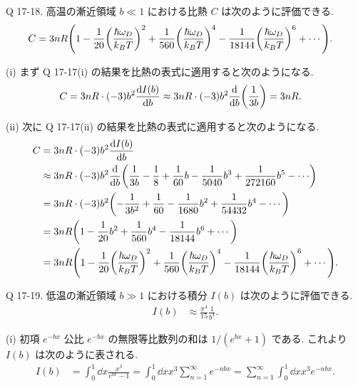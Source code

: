 \documentclass[uplatex,dvipdfmx,a4paper,11pt]{jlreq}
\theoremstyle{definition}
\begin{document}
\begin{itembox}[l]{Q 17-18.}
  高温の漸近領域 $b\ll 1$ における比熱 $C$ は次のように評価できる.
  \begin{align}
    C & = 3nR\qty(1 - \frac{1}{20}\qty(\frac{\hbar\omega_D}{k_BT})^2 + \frac{1}{560}\qty(\frac{\hbar\omega_D}{k_BT})^4 - \frac{1}{18144}\qty(\frac{\hbar\omega_D}{k_BT})^6 + \cdots).
  \end{align}
\end{itembox}

(i) まず Q 17-17(i) の結果を比熱の表式に適用すると次のようになる.
\begin{align}
  C & = 3nR\cdot (-3)b^2\dv{I(b)}{b} \approx 3nR\cdot (-3)b^2\dv{b}(\frac{1}{3b}) = 3nR.
\end{align}

(ii) 次に Q 17-17(ii) の結果を比熱の表式に適用すると次のようになる.
\begin{align}
  C & = 3nR\cdot (-3)b^2\dv{I(b)}{b}                                                                                                                                                \\
    & \approx 3nR\cdot (-3)b^2\dv{b}(\frac{1}{3b} - \frac{1}{8} + \frac{1}{60}b - \frac{1}{5040}b^3 + \frac{1}{272160}b^5 - \cdots)                                                 \\
    & = 3nR\cdot (-3)b^2\qty(-\frac{1}{3b^2} + \frac{1}{60} - \frac{1}{1680}b^2 + \frac{1}{54432}b^4 - \cdots)                                                                      \\
    & = 3nR\qty(1 - \frac{1}{20}b^2 + \frac{1}{560}b^4 - \frac{1}{18144}b^6 + \cdots)                                                                                               \\
    & = 3nR\qty(1 - \frac{1}{20}\qty(\frac{\hbar\omega_D}{k_BT})^2 + \frac{1}{560}\qty(\frac{\hbar\omega_D}{k_BT})^4 - \frac{1}{18144}\qty(\frac{\hbar\omega_D}{k_BT})^6 + \cdots).
\end{align}

\begin{itembox}[l]{Q 17-19.}
  低温の漸近領域 $b\gg 1$ における積分 $I(b)$ は次のように評価できる.
  \begin{align}
    I(b) & \approx \frac{\pi^4}{15}\frac{1}{b^4}.
  \end{align}
\end{itembox}

(i)
初項 $e^{-bx}$ 公比 $e^{-bx}$ の無限等比数列の和は $1/(e^{bx} + 1)$ である. これより $I(b)$ は次のように表される.
\begin{align}
  I(b) & = \int_0^1\dd{x}\frac{x^3}{e^{bx} - 1} = \int_0^1\dd{x}x^3\sum_{n=1}^{\infty}e^{-nbx} = \sum_{n=1}^{\infty}\int_0^1\dd{x}x^3e^{-nbx}.
\end{align}
\end{document}
